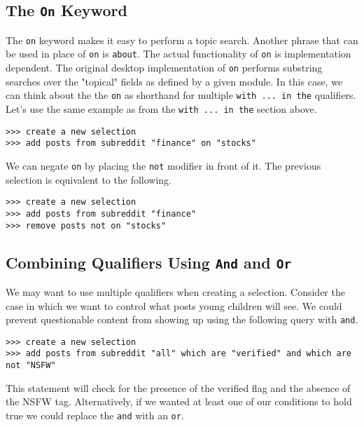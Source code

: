 \subsection{The \texttt{On} Keyword}
The \texttt{on} keyword makes it easy to perform a topic search. Another phrase that can be used in place of \texttt{on} is \texttt{about}. The actual functionality of \texttt{on} is implementation dependent. The original desktop implementation of \texttt{on} performs substring searches over the "topical" fields as defined by a given module. In this case, we can think about the the \texttt{on} as shorthand for multiple \texttt{with ... in the} qualifiers. Let’s use the same example as from the  \texttt{with ... in the} section above.
\newline\begin{minipage}{\linewidth}\begin{lstlisting}
>>> create a new selection
>>> add posts from subreddit "finance" on "stocks"
\end{lstlisting}\end{minipage}
We can negate \texttt{on} by placing the \texttt{not} modifier in front of it. The previous selection is equivalent to the following.
\newline\begin{minipage}{\linewidth}\begin{lstlisting}
>>> create a new selection
>>> add posts from subreddit "finance"
>>> remove posts not on "stocks"
\end{lstlisting}\end{minipage}
\subsection{Combining Qualifiers Using \texttt{And} and \texttt{Or}}
We may want to use multiple qualifiers when creating a selection. Consider the case in which we want to control what posts young children will see. We could prevent questionable content from showing up using the following query with \texttt{and}.
\newline\begin{minipage}{\linewidth}\begin{lstlisting}
>>> create a new selection
>>> add posts from subreddit "all" which are "verified" and which are not "NSFW"
\end{lstlisting}\end{minipage}
This statement will check for the presence of the verified flag and the absence of the NSFW tag. Alternatively, if we wanted at least one of our conditions to hold true we could replace the \texttt{and} with an \texttt{or}.

